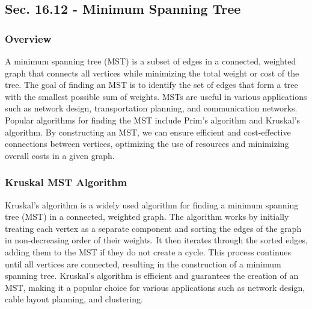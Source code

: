 \subsection*{Sec. 16.12 - Minimum Spanning Tree}

\subsubsection{Overview}

A minimum spanning tree (MST) is a subset of edges in a connected, weighted graph that connects all vertices while minimizing the total weight or cost of the tree. The goal of finding an MST is to identify the set of edges that form 
a tree with the smallest possible sum of weights. MSTs are useful in various applications such as network design, transportation planning, and communication networks. Popular algorithms for finding the MST include Prim's algorithm and 
Kruskal's algorithm. By constructing an MST, we can ensure efficient and cost-effective connections between vertices, optimizing the use of resources and minimizing overall costs in a given graph.

\subsubsection{Kruskal MST Algorithm}

Kruskal's algorithm is a widely used algorithm for finding a minimum spanning tree (MST) in a connected, weighted graph. The algorithm works by initially treating each vertex as a separate component and sorting the edges of the graph 
in non-decreasing order of their weights. It then iterates through the sorted edges, adding them to the MST if they do not create a cycle. This process continues until all vertices are connected, resulting in the construction of a minimum 
spanning tree. Kruskal's algorithm is efficient and guarantees the creation of an MST, making it a popular choice for various applications such as network design, cable layout planning, and clustering.

